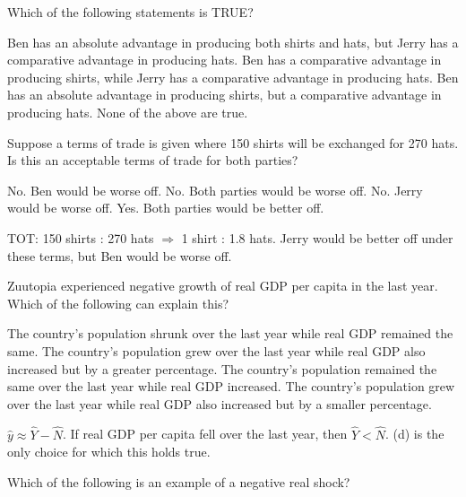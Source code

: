 \documentclass[addpoints,11pt]{exam}
\theoremstyle{definition}
\begin{document}
\begin{questions}
\question \label{q7} Which of the following statements is TRUE?

\begin{choices}
\choice Ben has an absolute advantage in producing both shirts and hats, but Jerry has a comparative advantage in producing hats.
\choice Ben has a comparative advantage in producing shirts, while Jerry has a comparative advantage in producing hats.
\CorrectChoice Ben has an absolute advantage in producing shirts, but a comparative advantage in producing hats.
\choice None of the above are true.
\end{choices}

\question \label{q8} Suppose a terms of trade is given where 150 shirts will be exchanged for 270 hats. Is this an acceptable terms of trade for both parties?

\begin{choices}
	\CorrectChoice No. Ben would be worse off.
	\choice No. Both parties would be worse off.
	\choice No. Jerry would be worse off.
	\choice Yes. Both parties would be better off.
\end{choices}

\begin{solution}
TOT: 150 shirts : 270 hats $\Rightarrow$ 1 shirt : 1.8 hats. Jerry would be better off under these terms, but Ben would be worse off.
\end{solution}


\question Zuutopia experienced negative growth of real GDP per capita in the last year. Which of the following can explain this?

\begin{choices}
\choice The country's population shrunk over the last year while real GDP remained the same.
\choice The country's population grew over the last year while real GDP also increased but by a greater percentage.
\choice The country's population remained the same over the last year while real GDP increased.
\CorrectChoice The country's population grew over the last year while real GDP also increased but by a smaller percentage.
\end{choices}

\begin{solution}
$\hat{y} \approx \hat{Y} - \hat{N}$. If real GDP per capita fell over the last year, then $\hat{Y} < \hat{N}$. (d) is the only choice for which this holds true.
\end{solution}


\question Which of the following is an example of a negative real shock?


\end{questions}
\end{document}
